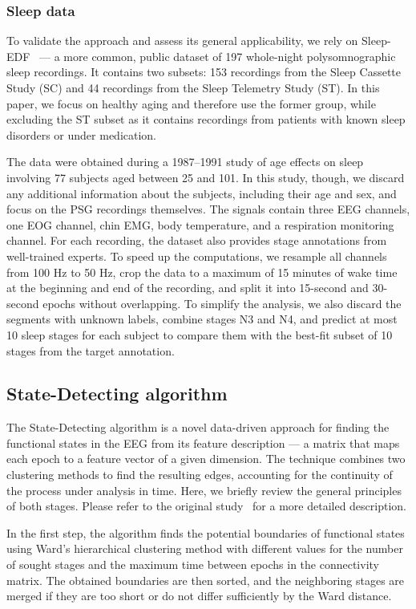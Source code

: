 \documentclass[pdflatex,sn-basic,Numbered]{sn-jnl}
\begin{document}
\subsubsection{Sleep data}

To validate the approach and assess its general applicability, we rely on Sleep-EDF~\cite{SleepEdf,PhysioNet} --- a more common, public dataset of 197 whole-night polysomnographic sleep recordings. It contains two subsets: 153 recordings from the Sleep Cassette Study (SC) and 44 recordings from the Sleep Telemetry Study (ST). In this paper, we focus on healthy aging and therefore use the former group, while excluding the ST subset as it contains recordings from patients with known sleep disorders or under medication.

The data were obtained during a 1987--1991 study of age effects on sleep involving 77 subjects aged between 25 and 101. In this study, though, we discard any additional information about the subjects, including their age and sex, and focus on the PSG recordings themselves. The signals contain three EEG channels, one EOG channel, chin EMG, body temperature, and a respiration monitoring channel. For each recording, the dataset also provides stage annotations from well-trained experts. To speed up the computations, we resample all channels from 100 Hz to 50 Hz, crop the data to a maximum of 15 minutes of wake time at the beginning and end of the recording, and split it into 15-second and 30-second epochs without overlapping. To simplify the analysis, we also discard the segments with unknown labels, combine stages N3 and N4, and predict at most 10 sleep stages for each subject to compare them with the best-fit subset of 10 stages from the target annotation.


\subsection{State-Detecting algorithm}

The State-Detecting algorithm is a novel data-driven approach for finding the functional states in the EEG from its feature description --- a matrix that maps each epoch to a feature vector of a given dimension. The technique combines two clustering methods to find the resulting edges, accounting for the continuity of the process under analysis in time. Here, we briefly review the general principles of both stages. Please refer to the original study~\cite{SDA} for a more detailed description.

In the first step, the algorithm finds the potential boundaries of functional states using Ward's hierarchical clustering method with different values for the number of sought stages and the maximum time between epochs in the connectivity matrix. The obtained boundaries are then sorted, and the neighboring stages are merged if they are too short or do not differ sufficiently by the Ward distance.
\end{document}
